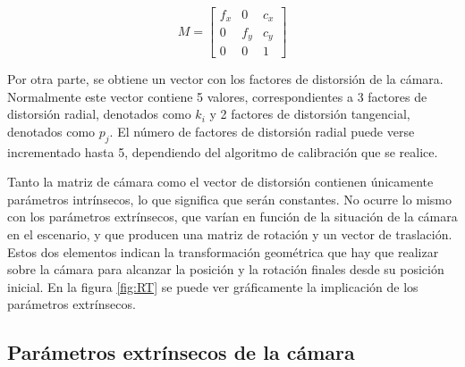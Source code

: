 \begin{equation}
  M =
  \begin{bmatrix}
    f_{x} & {0} & {c_{x}} \\
    {0}&{f_{y}}&{c_{y}}\\
    {0}&{0}&{1}
  \end{bmatrix}
\end{equation}

Por otra parte, se obtiene un vector con los factores de distorsión de la cámara. Normalmente este vector contiene 5 valores, correspondientes a 3 factores de distorsión radial, denotados como $k_{i}$ y 2 factores de distorsión tangencial, denotados como $p_{j}$. El número de factores de distorsión radial puede verse incrementado hasta 5, dependiendo del algoritmo de calibración que se realice.



Tanto la matriz de cámara como el vector de distorsión contienen únicamente parámetros intrínsecos, lo que significa que serán constantes. No ocurre lo mismo con los parámetros extrínsecos, que varían en función de la situación de la cámara en el escenario, y que producen una matriz de rotación y un vector de traslación. Estos dos elementos indican la transformación geométrica que hay que realizar sobre la cámara para alcanzar la posición y la rotación finales desde su posición inicial. En la figura \ref{fig:RT} se puede ver gráficamente la implicación de los parámetros extrínsecos.





\subsection{Parámetros extrínsecos de la cámara}

